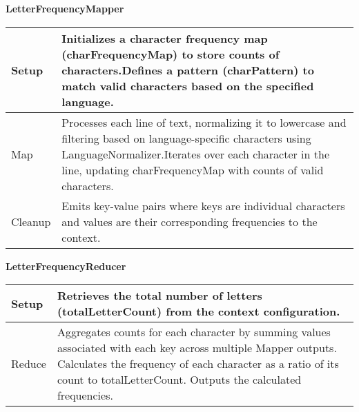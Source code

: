 \textbf{LetterFrequencyMapper}
\begin{longtable}{|>{\raggedright\arraybackslash}p{}|>{\raggedright\arraybackslash}p{}|}
    \hline
    Setup & Initializes a character frequency map (charFrequencyMap) to store counts of characters.Defines a pattern (charPattern) to match valid characters based on the specified language. \\
    \hline
    Map & Processes each line of text, normalizing it to lowercase and filtering based on language-specific characters using LanguageNormalizer.Iterates over each character in the line, updating charFrequencyMap with counts of valid characters.\\
    \hline
    Cleanup & Emits key-value pairs where keys are individual characters and values are their corresponding frequencies to the context.
    \\
    \hline
\end{longtable}


\textbf{LetterFrequencyReducer}
\begin{longtable}{|>{\raggedright\arraybackslash}p{}|>{\raggedright\arraybackslash}p{}|}
    \hline
    Setup & Retrieves the total number of letters (totalLetterCount) from the context configuration. \\
    \hline
    Reduce & Aggregates counts for each character by summing values associated with each key across multiple Mapper outputs.
    Calculates the frequency of each character as a ratio of its count to totalLetterCount.
    Outputs the calculated frequencies.\\
    \hline
\end{longtable}













